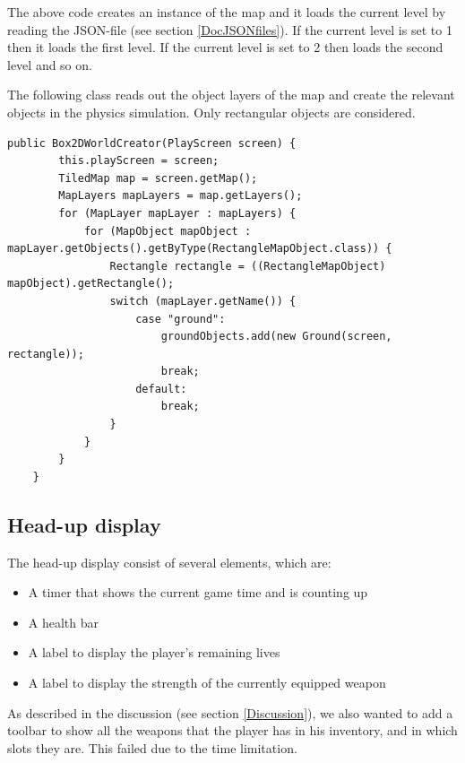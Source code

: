 \documentclass[12p]{article}
\begin{document}
The above code creates an instance of the map and it loads the current level by reading the JSON-file (see section \ref{DocJSONfiles}). If the current level is set to 1 then it loads the first level. If the current level is set to 2 then loads the second level and so on.

The following class reads out the object layers of the map and create the relevant objects in the physics simulation. Only rectangular objects are considered.

\begin{verbatim}
public Box2DWorldCreator(PlayScreen screen) {
        this.playScreen = screen;
        TiledMap map = screen.getMap();
        MapLayers mapLayers = map.getLayers();
        for (MapLayer mapLayer : mapLayers) {
            for (MapObject mapObject : mapLayer.getObjects().getByType(RectangleMapObject.class)) {
                Rectangle rectangle = ((RectangleMapObject) mapObject).getRectangle();
                switch (mapLayer.getName()) {
                    case "ground":
                        groundObjects.add(new Ground(screen, rectangle));
                        break;
                    default:
                        break;
                }
            }
        }
    }
\end{verbatim}


\newpage
\subsection{Head-up display} \label{DocHUD}

The head-up display consist of several elements, which are:

\begin{itemize}
    \item A timer that shows the current game time and is counting up
    \item A health bar
    \item A label to display the player's remaining lives
    \item A label to display the strength of the currently equipped weapon
\end{itemize}

As described in the discussion (see section \ref{Discussion}), we also wanted to add a toolbar to show all the weapons that the player has in his inventory, and in which slots they are. This failed due to the time limitation.
\end{document}
